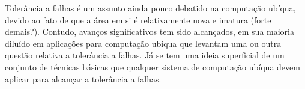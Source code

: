Tolerância a falhas é um assunto ainda pouco debatido na computação ubíqua, devido ao fato de que a área em si é relativamente nova e imatura (forte demais?). Contudo, avanços significativos tem sido alcançados, em sua maioria diluído em aplicações para computação ubíqua que levantam uma ou outra questão relativa a tolerância a falhas. Já se tem uma ideia superficial de um conjunto de técnicas básicas que qualquer sistema de computação ubíqua devem aplicar para alcançar a tolerância a falhas.
